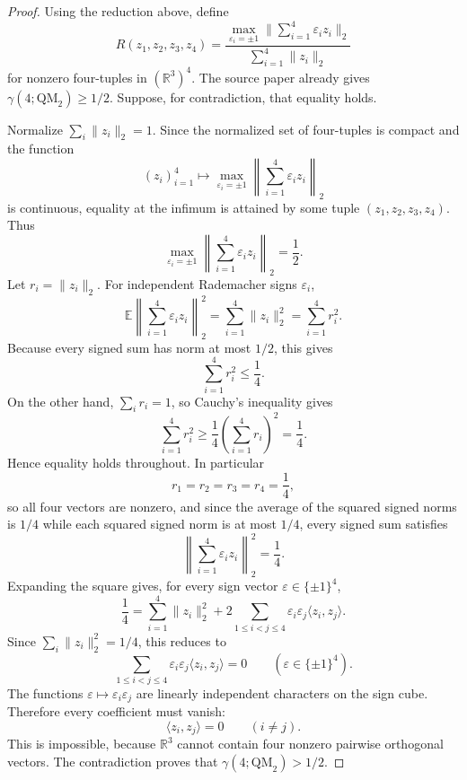 \documentclass[11pt]{article}
\begin{document}
\begin{proof}
Using the reduction above, define
\[
R(z_1,z_2,z_3,z_4)=
\frac{\max_{\varepsilon_i=\pm1}\|\sum_{i=1}^4\varepsilon_i z_i\|_2}
{\sum_{i=1}^4\|z_i\|_2}
\]
for nonzero four-tuples in \((\mathbb R^3)^4\).  The source paper already gives
\(\gamma(4;\mathrm{QM}_2)\geq 1/2\).  Suppose, for contradiction, that equality holds.

Normalize \(\sum_i\|z_i\|_2=1\).  Since the normalized set of four-tuples is compact and
the function
\[
(z_i)_{i=1}^4\mapsto
\max_{\varepsilon_i=\pm1}\left\|\sum_{i=1}^4\varepsilon_i z_i\right\|_2
\]
is continuous, equality at the infimum is attained by some tuple
\((z_1,z_2,z_3,z_4)\).  Thus
\[
\max_{\varepsilon_i=\pm1}\left\|\sum_{i=1}^4\varepsilon_i z_i\right\|_2=\frac12.
\]
Let \(r_i=\|z_i\|_2\).  For independent Rademacher signs \(\varepsilon_i\),
\[
\mathbb E\left\|\sum_{i=1}^4\varepsilon_i z_i\right\|_2^2
=\sum_{i=1}^4\|z_i\|_2^2
=\sum_{i=1}^4 r_i^2.
\]
Because every signed sum has norm at most \(1/2\), this gives
\[
\sum_{i=1}^4 r_i^2\leq \frac14.
\]
On the other hand, \(\sum_i r_i=1\), so Cauchy's inequality gives
\[
\sum_{i=1}^4 r_i^2\geq \frac{1}{4}\left(\sum_{i=1}^4 r_i\right)^2=\frac14.
\]
Hence equality holds throughout.  In particular
\[
r_1=r_2=r_3=r_4=\frac14,
\]
so all four vectors are nonzero, and since the average of the squared signed norms is \(1/4\)
while each squared signed norm is at most \(1/4\), every signed sum satisfies
\[
\left\|\sum_{i=1}^4\varepsilon_i z_i\right\|_2^2=\frac14.
\]
Expanding the square gives, for every sign vector \(\varepsilon\in\{\pm1\}^4\),
\[
\frac14
=\sum_{i=1}^4\|z_i\|_2^2
+2\sum_{1\leq i<j\leq 4}\varepsilon_i\varepsilon_j\langle z_i,z_j\rangle.
\]
Since \(\sum_i\|z_i\|_2^2=1/4\), this reduces to
\[
\sum_{1\leq i<j\leq 4}\varepsilon_i\varepsilon_j\langle z_i,z_j\rangle=0
\qquad(\varepsilon\in\{\pm1\}^4).
\]
The functions \(\varepsilon\mapsto \varepsilon_i\varepsilon_j\) are linearly independent
characters on the sign cube.  Therefore every coefficient must vanish:
\[
\langle z_i,z_j\rangle=0\qquad (i\ne j).
\]
This is impossible, because \(\mathbb R^3\) cannot contain four nonzero pairwise orthogonal
vectors.  The contradiction proves that \(\gamma(4;\mathrm{QM}_2)>1/2\).


\end{proof}
\end{document}
